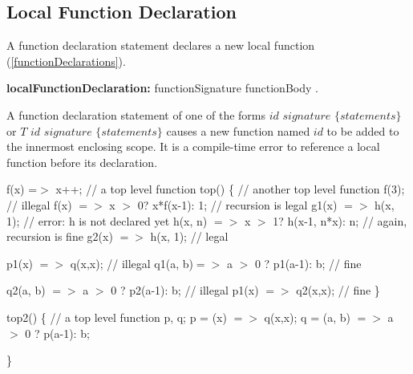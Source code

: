 \documentclass{article}
\begin{document}
\begin{itemize}
\subsection{Local Function Declaration}

\LMHash{}
A function declaration statement declares a new local function (\ref{functionDeclarations}).

 \begin{grammar}
{\bf localFunctionDeclaration:}
    functionSignature functionBody
  .
 \end{grammar}

\LMHash{}
A function declaration statement of one of the forms $id$ $signature$ $\{ statements \}$ or $T$ $id$ $signature$ $\{ statements \}$ causes a new function named $id$ to be added to the innermost enclosing scope. It is a compile-time error to reference a local function before its declaration.



\begin{dartCode}
f(x) =$>$ x++;  // a top level function
top() \{ // another top level function
  f(3); // illegal
  f(x) $=>$ x $>$ 0? x*f(x-1): 1;  // recursion is legal
  g1(x) $=>$ h(x, 1); // error: h is not declared yet
  h(x, n) $=>$ x $>$ 1? h(x-1, n*x): n; // again, recursion is fine
  g2(x) $=>$ h(x, 1); // legal

  p1(x) $=>$ q(x,x); // illegal
  q1(a, b)$ =>$ a $>$ 0 ? p1(a-1): b; // fine

  q2(a, b) $=>$ a $>$ 0 ? p2(a-1): b; // illegal
  p1(x) $=>$ q2(x,x); // fine
\}
\end{dartCode}


\begin{dartCode}
top2() \{ // a top level function
 \VAR{} p, q;
  p = (x) $=>$ q(x,x);
  q = (a, b) $=>$ a $>$ 0 ? p(a-1): b;

\}
\end{dartCode}



\end{itemize}
\end{document}
